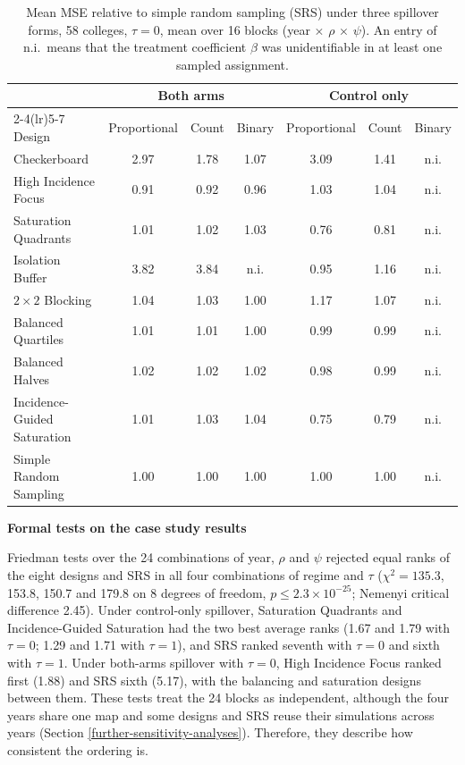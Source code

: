 \documentclass[11pt]{article}
\newcommand{\sihead}[1]{\par\medskip\noindent\textbf{#1}\par\nopagebreak\noindent\ignorespaces}
\begin{document}
\begin{table}[!htb]
\small
\centering
\caption{Mean MSE relative to simple random sampling (SRS) under three spillover forms, 58 colleges, $\tau = 0$, mean over 16 blocks (year $\times$ $\rho$ $\times$ $\psi$). An entry of n.i.\ means that the treatment coefficient $\beta$ was unidentifiable in at least one sampled assignment.}
\label{tab:nc-forms}
\begin{tabular}{lcccccc}
\toprule
& \multicolumn{3}{c}{Both arms} & \multicolumn{3}{c}{Control only} \\
\cmidrule(lr){2-4}\cmidrule(lr){5-7}
Design & Proportional & Count & Binary & Proportional & Count & Binary \\
\midrule
Checkerboard & 2.97 & 1.78 & 1.07 & 3.09 & 1.41 & n.i. \\
High Incidence Focus & 0.91 & 0.92 & 0.96 & 1.03 & 1.04 & n.i. \\
Saturation Quadrants & 1.01 & 1.02 & 1.03 & 0.76 & 0.81 & n.i. \\
Isolation Buffer & 3.82 & 3.84 & n.i. & 0.95 & 1.16 & n.i. \\
$2\times2$ Blocking & 1.04 & 1.03 & 1.00 & 1.17 & 1.07 & n.i. \\
Balanced Quartiles & 1.01 & 1.01 & 1.00 & 0.99 & 0.99 & n.i. \\
Balanced Halves & 1.02 & 1.02 & 1.02 & 0.98 & 0.99 & n.i. \\
Incidence-Guided Saturation & 1.01 & 1.03 & 1.04 & 0.75 & 0.79 & n.i. \\
Simple Random Sampling & 1.00 & 1.00 & 1.00 & 1.00 & 1.00 & n.i. \\
\bottomrule
\end{tabular}
\end{table}

\iffullsi
\sihead{Formal tests on the case study results}
Friedman tests over the 24 combinations of year, $\rho$ and $\psi$ rejected equal ranks of the eight designs and SRS in all four combinations of regime and $\tau$ ($\chi^2 = 135.3$, 153.8, 150.7 and 179.8 on 8 degrees of freedom, $p \le 2.3\times10^{-25}$; Nemenyi critical difference 2.45). Under control-only spillover, Saturation Quadrants and Incidence-Guided Saturation had the two best average ranks (1.67 and 1.79 with $\tau = 0$; 1.29 and 1.71 with $\tau = 1$), and SRS ranked seventh with $\tau = 0$ and sixth with $\tau = 1$. Under both-arms spillover with $\tau = 0$, High Incidence Focus ranked first (1.88) and SRS sixth (5.17), with the balancing and saturation designs between them. These tests treat the 24 blocks as independent, although the four years share one map and some designs and SRS reuse their simulations across years (Section \ref{further-sensitivity-analyses}). Therefore, they describe how consistent the ordering is.
\fi
\end{document}
